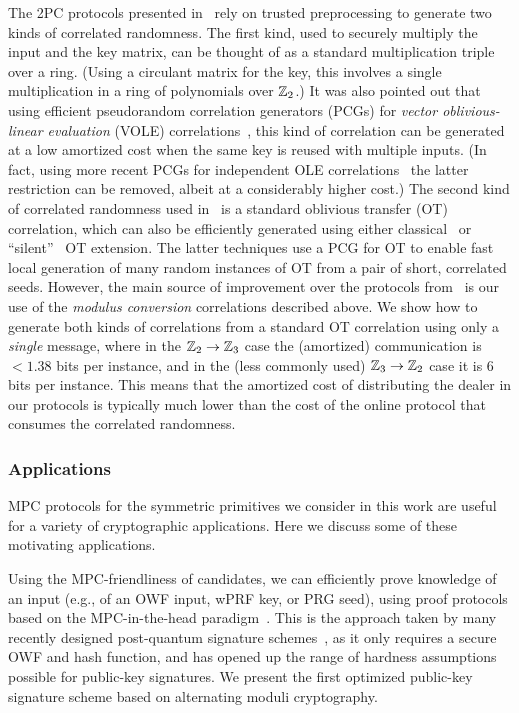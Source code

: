  The 2PC protocols presented in~\cite{boneh2018-darkmatter} rely on trusted preprocessing to generate two kinds of correlated randomness. The first kind, used to securely multiply the input and the key matrix, can be thought of as a standard multiplication triple~\cite{beaver1991-triples} over a ring. (Using a circulant matrix for the key, this involves a single multiplication in a ring of polynomials over $\mathbb{Z}_2$.)  It was also pointed out that using efficient pseudorandom correlation generators (PCGs) for {\em vector oblivious-linear evaluation} (VOLE) correlations~\cite{BCGI18,BCGIKRS19,SchoppmannGR019}, this kind of correlation can be generated at a low amortized cost when the same key is reused with multiple inputs. (In fact, using more recent PCGs for independent OLE correlations~\cite{boyle2020-lpn-pcg} the latter restriction can be removed, albeit at a considerably higher cost.)  The second kind of correlated randomness used in~\cite{boneh2018-darkmatter} is a standard oblivious transfer (OT) correlation, which can also be efficiently generated using either classical~\cite{IKNP} or ``silent''~\cite{BCGIKRS19,yang2020-ferret} OT extension. The latter techniques use a PCG for OT to enable fast local generation of many random instances of OT from a pair of short, correlated seeds.
However, the main source of improvement over the protocols from~\cite{boneh2018-darkmatter}  is our use of the {\em modulus conversion} correlations described above. We show how to generate both kinds of correlations from a standard OT correlation using only a {\em single} message, where in the $\mathbb{Z}_2 \to \mathbb{Z}_3$ case the (amortized) communication is $<1.38$ bits per instance, and in the (less commonly used) $\mathbb{Z}_3 \to \mathbb{Z}_2$ case it is $6$ bits per instance. This means that the amortized cost of distributing the dealer in our protocols is typically much lower than the cost of the online protocol that consumes the correlated randomness.


\subsubsection{Applications}
MPC protocols for the symmetric primitives we consider in this work are useful for a variety of cryptographic applications. Here we discuss some of these motivating applications.

 Using the MPC-friendliness of candidates, we can efficiently prove knowledge of
an input (e.g., of an OWF input, wPRF key, or PRG seed), using proof protocols
based on the MPC-in-the-head paradigm~\cite{ishai2007-zkmpc}.  This is the approach
taken by many recently designed post-quantum signature
schemes~\cite{chase2017-picnic,CCS:KatKolWan18,beullens2020-sigma-mq,beullens2020-legroast,guilhem2019-bbq,banquet},
as it only requires a secure OWF and hash function, and has opened up the range
of hardness assumptions possible for public-key signatures.  We present the
first optimized public-key signature scheme based on alternating moduli cryptography.

